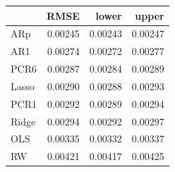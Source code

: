 \begin{tabular}{lrrr}
\toprule
 & RMSE & lower & upper \\
\midrule
ARp & 0.00245 & 0.00243 & 0.00247 \\
AR1 & 0.00274 & 0.00272 & 0.00277 \\
PCR6 & 0.00287 & 0.00284 & 0.00289 \\
Lasso & 0.00290 & 0.00288 & 0.00293 \\
PCR1 & 0.00292 & 0.00289 & 0.00294 \\
Ridge & 0.00294 & 0.00292 & 0.00297 \\
OLS & 0.00335 & 0.00332 & 0.00337 \\
RW & 0.00421 & 0.00417 & 0.00425 \\
\bottomrule
\end{tabular}
